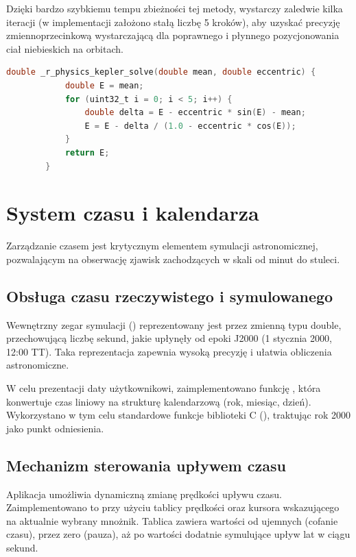          Dzięki bardzo szybkiemu tempu zbieżności tej metody, wystarczy zaledwie kilka iteracji (w implementacji założono stałą liczbę 5 kroków), aby uzyskać precyzję zmiennoprzecinkową wystarczającą dla poprawnego i płynnego pozycjonowania ciał niebieskich na orbitach.

        \vspace{1em}
        \begin{lstlisting}[language=C, caption={Implementacja algorytmu Newtona-Raphsona do numerycznego rozwiązywania równania Keplera}, label={lst:kepler_solve}]
        double _r_physics_kepler_solve(double mean, double eccentric) {
            double E = mean;
            for (uint32_t i = 0; i < 5; i++) {
                double delta = E - eccentric * sin(E) - mean;
                E = E - delta / (1.0 - eccentric * cos(E));
            }
            return E;
        }
        \end{lstlisting}

        \newpage

    \section{System czasu i kalendarza}
     Zarządzanie czasem jest krytycznym elementem symulacji astronomicznej, pozwalającym na obserwację zjawisk zachodzących w skali od minut do stuleci.

        \subsection{Obsługa czasu rzeczywistego i symulowanego}
         Wewnętrzny zegar symulacji () reprezentowany jest przez zmienną typu double, przechowującą liczbę sekund, jakie upłynęły od epoki J2000 (1 stycznia 2000, 12:00 TT).
         Taka reprezentacja zapewnia wysoką precyzję i ułatwia obliczenia astronomiczne.

         W celu prezentacji daty użytkownikowi, zaimplementowano funkcję , która konwertuje czas liniowy na strukturę kalendarzową  (rok, miesiąc, dzień).
         Wykorzystano w tym celu standardowe funkcje biblioteki C (), traktując rok 2000 jako punkt odniesienia.

        \subsection{Mechanizm sterowania upływem czasu}
         Aplikacja umożliwia dynamiczną zmianę prędkości upływu czasu. 
         Zaimplementowano to przy użyciu tablicy prędkości  oraz kursora wskazującego na aktualnie wybrany mnożnik. 
         Tablica zawiera wartości od ujemnych (cofanie czasu), przez zero (pauza), aż po wartości dodatnie symulujące upływ lat w ciągu sekund.

